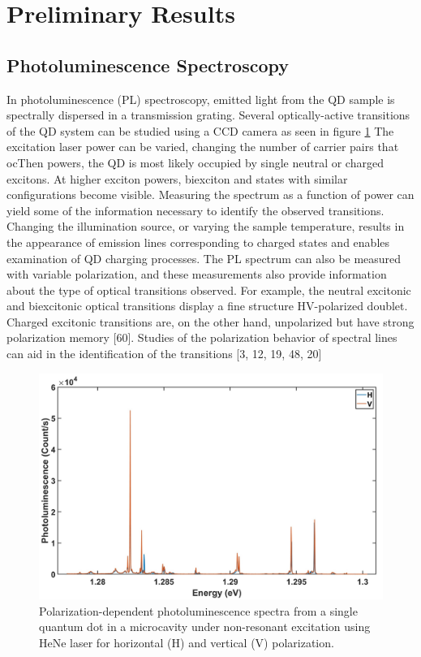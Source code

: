 \section{Preliminary Results}
\subsection{Photoluminescence Spectroscopy}
In photoluminescence (PL) spectroscopy, emitted light from the QD sample is spectrally dispersed in a transmission grating. Several optically-active transitions of the QD system can be studied using a CCD camera  as seen in figure \ref{fig:Spectrum_HV} The excitation laser power can be varied, changing the number of carrier pairs that ocThen powers, the QD is most likely occupied by single neutral or charged excitons. At higher exciton powers, biexciton and states with similar configurations become visible. Measuring the spectrum as a function of power can yield some of the information necessary to identify the observed transitions. Changing the illumination source, or varying the sample temperature, results in the appearance of emission lines corresponding to charged states and enables examination of QD charging processes.
The PL spectrum can also be measured with variable polarization, and these measurements also provide information about the type of optical transitions observed. For example, the neutral excitonic and biexcitonic optical transitions display a fine structure HV-polarized doublet. Charged excitonic transitions are, on the other hand, unpolarized but have strong polarization memory [60]. Studies of the polarization behavior of spectral lines can aid in the identification of the transitions [3, 12, 19, 48, 20]
\begin{figure}[H]
		\centering
		\includegraphics[scale=0.27]{figures/Spectrum.jpg}
		\caption{Polarization-dependent photoluminescence spectra from a single quantum dot in a microcavity under non-resonant excitation using HeNe laser for horizontal (H) and vertical (V) polarization.}
		\label{fig:Spectrum_HV}
	\end{figure}
